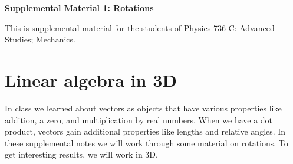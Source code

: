 
%

\def\red#1{{\color{red}#1}}
\def\blue#1{{\color{blue}#1}}
\def\green#1{{\color{green}#1}}

\usepackage{placeins}

\def\gap{38mm}

\usepackage{amsthm} %
\theoremstyle{definition}
\newtheorem{definition}{Definition}
\theoremstyle{plain}
\newtheorem{proposition}{Proposition}
\newtheorem{lemma}{Lemma}
\newtheorem{theorem}{Theorem}
\newtheorem{corollary}{Corollary}
\newtheorem{conjecture}{Conjecture}
\newtheorem{example}{Example}
\newtheorem{result}{Result}
\newtheorem{claim}{Claim}
\newtheorem*{result*}{Result}
\newtheorem{exercise}{Exercise}
\newtheorem{problem}{Problem}




{\center
{\color{violet}\fontsize{28pt}{34pt}\bf\sffamily 
Supplemental Material 1: Rotations
\\[.5in]
}

}
{\abstract
This is supplemental material for the students of Physics 736-C: Advanced Studies; Mechanics.
}






\section{Linear algebra in 3D}
In class we learned about vectors as objects that have various properties like addition, a zero, and multiplication by real numbers. 
When we have a dot product, vectors gain additional properties like lengths and relative angles. 
In these supplemental notes we will work through some material on rotations. 
To get interesting results, we will work in 3D. 

